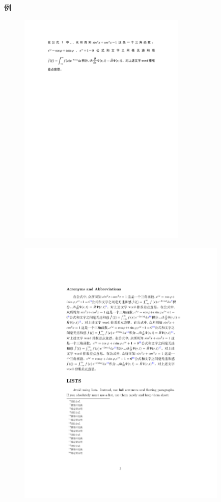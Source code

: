 \documentclass{beamer}
\begin{document}
\begin{frame}{例}
		\begin{figure}[h]
			\centering
			\includegraphics[width=8cm]{images/排版1.pdf}
			\label{fig:Figure3}
		\end{figure}
		
		\vspace{0cm} 
		\begin{figure}[h]
			\centering
			\includegraphics[width=10cm]{images/排版2.pdf}
			\label{fig:Figure4}
		\end{figure}
	
\end{frame}		
\end{document}
